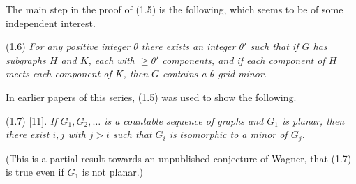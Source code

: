 The main step in the proof of (1.5) is the following, which seems to be of some independent interest.

\stmt
(1.6) \textit{For any positive integer $\theta$ there exists an integer $\theta'$ such that if $G$ has subgraphs $H$ and $K$, each with $\ge \theta'$ components, and if each component of $H$ meets each component of $K$, then $G$ contains a $\theta$-grid minor.}

In earlier papers of this series, (1.5) was used to show the following.

\stmt
(1.7) [11]. \textit{If $G_1, G_2, \ldots$ is a countable sequence of graphs and $G_1$ is planar, then there exist $i, j$ with $j > i$ such that $G_i$ is isomorphic to a minor of $G_j$.}

(This is a partial result towards an unpublished conjecture of Wagner, that (1.7) is true even if $G_1$ is not planar.)
